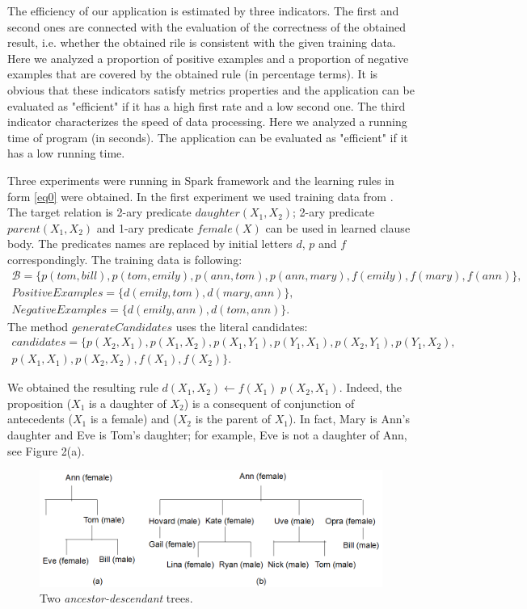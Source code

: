 \documentclass{scrartcl}
\begin{document}
The efficiency of our application is estimated by three indicators. The first and second ones are connected with the evaluation of the correctness of the obtained result, i.e. whether the obtained rile is consistent with the given training data. Here we analyzed a proportion of positive examples and a proportion of negative examples that are covered by the obtained rule (in percentage terms). It is obvious that these indicators satisfy metrics properties and the application can be evaluated as  \textrm{"}efficient\textrm{"} if it has a high first rate and a low second one.
The third indicator characterizes the speed of data processing. Here we analyzed a running time of program (in seconds). The application can be evaluated as  \textrm{"}efficient\textrm{"} if it has a low running time.

Three experiments were running in Spark framework and the learning rules in form \eqref{eq0} were obtained.
In the first experiment we used training data from \citep{Horvath2016}. The target relation is 2-ary predicate $daughter(X_1,X_2)$;  2-ary predicate $parent(X_1,X_2)$ and 1-ary predicate $female(X)$ can be used in learned clause body. The predicates names are replaced by initial letters $d$, $p$ and $f$ correspondingly.  The training data is following:
\begin{multline}\label{eq13a}
\!\!\!\!\mathcal{B}= \{p(tom, bill), p(tom, emily), p(ann, tom), p(ann, mary),
f(emily), f(mary), f(ann)\},\\
PositiveExamples= \{d(emily, tom), d(mary, ann) \},\\
NegativeExamples= \{ d(emily, ann), d(tom, ann)\}.
\end{multline}
The method $generateCandidates$ uses the literal candidates:
\begin{multline}\label{eq13b}
candidates=\{
p(X_2, X_1), p(X_1, X_2), p(X_1, Y_1), p(Y_1, X_1), p(X_2, Y_1), p(Y_1, X_2),\\ p(X_1, X_1), p(X_2, X_2), f(X_1),f(X_2)\}.
\end{multline}

We obtained the resulting rule $d(X_1, X_2)\leftarrow f(X_1)\; p(X_2, X_1)$. Indeed, the proposition ($X_1$ is a daughter of $X_2$) is a consequent of conjunction of antecedents  ($X_1$ is a female) and ($X_2$ is the parent of $X_1$). In fact,  Mary is Ann's daughter and Eve is Tom's daughter; for example, Eve is not a daughter of Ann,  see Figure 2(a).
\begin{figure}[h!] \centering
\includegraphics[bb =0 0 1055 346,scale =0.28]{tree_ds.png}
\caption{Two \emph{ancestor-descendant} trees.}
\end{figure}
\end{document}
